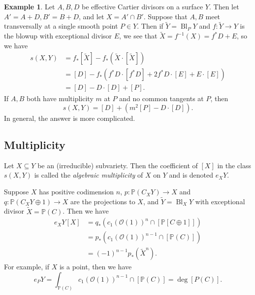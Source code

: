 \documentclass[leqno, openany]{memoir}
\theoremstyle{definition}
\newtheorem{exm}[thm]{Example}
\theoremstyle{remark}
\theoremstyle{plain}
\theoremstyle{definition}
\theoremstyle{remark}
\renewcommand{\P}{\mathbb{P}}
\newcommand{\msc}[1]{\mathscr{#1}}
\newcommand{\wt}[1]{\widetilde{#1}}
\DeclareMathOperator{\Bl}{Bl}
\begin{document}
\begin{exm}
    Let $A, B, D$ be effective Cartier divisors on a surface $Y$. Then let $A' = A + D, B' = B + D$, and let $X = A' \cap B'$. Suppose that $A, B$ meet transversally at a single smooth point $P \in Y$. Then if $\wt{Y} = \Bl_P Y$ and $f \colon \wt{Y} \to Y$ is the blowup with exceptional divisor $E$, we see that $\wt{X} = f^{-1}(X) = f^* D + E$, so we have
    \begin{align*}
        s(X,Y) &= f_* [\wt{X}] - f_* (\wt{X} \cdot [\wt{X}]) \\
               &= [D] - f_* (f^* D \cdot [f^* D] + 2 f^* D \cdot [E] + E \cdot [E]) \\
               &= [D] - D \cdot [D] + [P]. 
    \end{align*}
    If $A,B$ both have multiplicity $m$ at $P$ and no common tangents at $P$, then
    \[ s(X,Y) = [D] + (m^2[P] - D \cdot [D]). \]
    In general, the answer is more complicated.
\end{exm}

\subsection{Multiplicity}%
\label{sub:multiplicity}

Let $X \subseteq Y$ be an (irreducible) subvariety. Then the coefficient of $[X]$ in the class $s(X,Y)$ is called the \textit{algebraic multiplicity} of $X$ on $Y$ and is denoted $e_X Y$. 

Suppose $X$ has positive codimension $n$, $p \colon \P(C_X Y) \to X$ and $q \colon \P(C_X Y \oplus 1) \to X$ are the projections to $X$, and $\wt{Y} = \operatorname{Bl}_X Y$ with exceptional divisor $\wt{X} = \P(C)$. Then we have
\begin{align*}
    e_X Y [X] &= q_* ( {c_1 ( \msc{O}(1) )}^n \cap [\P[C \oplus 1]] ) \\
              &= p_* ({c_1 (\msc{O}(1))}^{n-1} \cap [\P(C)]) \\
              &= {(-1)}^{n-1} p_* (\wt{X}^n). 
\end{align*}
For example, if $X$ is a point, then we have
\[ e_P Y = \int_{\P(C)} {c_1(\msc{O}(1))}^{n-1} \cap [\P(C)] = \deg [P(C)]. \]
\end{document}
